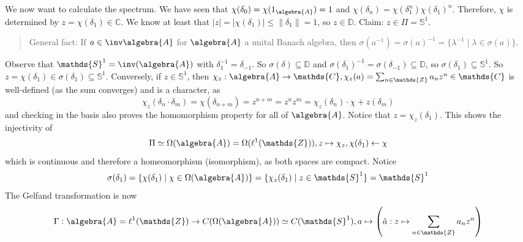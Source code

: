 \documentclass[a4paper]{article}
\begin{document}
\begin{example}
\begin{enumerate}
		      We now want to calculate the spectrum.
		      We have seen that $\chi(\delta_0) = \chi(1_\algebra{A}) = 1$ and $\chi(\delta_n) = \chi(\delta_1^n)  \chi(\delta_1)^n$.
		      Therefore, $\chi$ is determined by $z = \chi(\delta_1) \in \mathds{C}$.
		      We know at least that $|z| = |\chi(\delta_1)| \leq \|\delta_1\| = 1$, so $z \in \mathds{D}$.
		      Claim: $z \in \Pi = \mathds{S}^1$.
		      \begin{quote}
			      General fact: If $a \in \inv \algebra{A}$ for $\algebra{A}$ a unital Banach algebra, then $\sigma(a^{-1}) = \sigma(a)^{-1} = \{ \lambda^{-1} \mid \lambda \in \sigma(a) \}$.
		      \end{quote}
		      Observe that $\mathds{S}^1 = \inv(\algebra{A})$ with $\delta_1^{-1} = \delta_{-1}$.
		      So $\sigma(\delta) \subseteq \mathds{D}$ and $\sigma(\delta_1)^{-1} = \sigma(\delta_{-1}) \subseteq \mathds{D}$, so $\sigma(\delta_1) \subseteq \mathds{S}^1$.
		      So $z = \chi(\delta_1) \in \sigma(\delta_1) \subseteq \mathds{S}^1$.
		      Conversely, if $z \in \mathds{S}^1$, then $\chi_z: \algebra{A} \to \mathds{C}, \chi_z(a) = \sum_{n \in \mathds{Z}} a_n z^n \in \mathds{C}$ is well-defined (as the sum converges) and is a character, as
		      \begin{equation*}
			      \chi_z(\delta_n \cdot \delta_m) = \chi(\delta_{n + m}) = z^{n+m} = z^n z^m = \chi_z(\delta_n) \cdot \chi+z(\delta_m)
		      \end{equation*}
		      and checking in the basis also proves the homomorphism property for all of $\algebra{A}$. Notice that $z = \chi_z(\delta_1)$. This shows the injectivity of
		      \begin{equation*}
			      \Pi \simeq \Omega(\algebra{A}) = \Omega(\ell^1(\mathds{Z})), z \mapsto \chi_z, \chi(\delta_1) \leftarrow \chi
		      \end{equation*}
		      which is continuous and therefore a homeomorphism (isomorphism), as both spaces are compact.
		      Notice
		      \begin{equation*}
			      \sigma(\delta_1) = \{\chi(\delta_1) \mid \chi \in \Omega(\algebra{A}) \}  = \{\chi_z(\delta_1) \mid z \in \mathds{S}^1 \} = \mathds{S}^1
		      \end{equation*}
		      The Gelfand transformation is now
		      \begin{equation*}
			      \Gamma: \algebra{A} = \ell^1(\mathds{Z}) \to C(\Omega(\algebra{A})) \simeq C(\mathds{S}^1), a \mapsto  \left( \hat a: z \mapsto \sum_{n \in \mathds{Z}} a_n z^n \right)
		      \end{equation*}


\end{enumerate}
\end{example}
\end{document}
